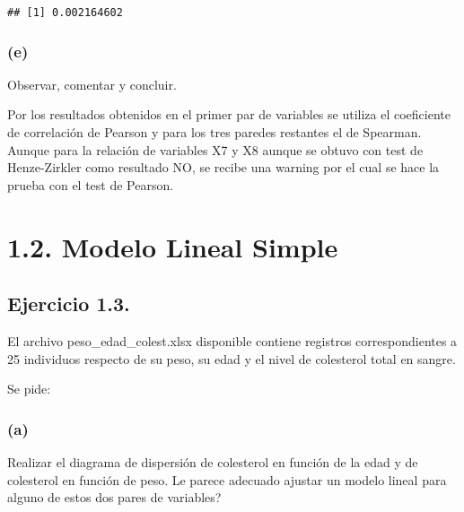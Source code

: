 \documentclass[
]{article}
\newenvironment{Shaded}{\begin{snugshade}}{\end{snugshade}}
\newcommand{\AttributeTok}[1]{\textcolor[rgb]{0.77,0.63,0.00}{#1}}
\newcommand{\FunctionTok}[1]{\textcolor[rgb]{0.00,0.00,0.00}{#1}}
\newcommand{\NormalTok}[1]{#1}
\newcommand{\SpecialCharTok}[1]{\textcolor[rgb]{0.00,0.00,0.00}{#1}}
\newcommand{\StringTok}[1]{\textcolor[rgb]{0.31,0.60,0.02}{#1}}
\begin{document}
\begin{Shaded}
\end{Shaded}

\begin{verbatim}
## [1] 0.002164602
\end{verbatim}

\hypertarget{e}{%
\subsubsection{(e)}\label{e}}

Observar, comentar y concluir.

Por los resultados obtenidos en el primer par de variables se utiliza el
coeficiente de correlación de Pearson y para los tres paredes restantes
el de Spearman. Aunque para la relación de variables X7 y X8 aunque se
obtuvo con test de Henze-Zirkler como resultado NO, se recibe una
warning por el cual se hace la prueba con el test de Pearson.

\hypertarget{modelo-lineal-simple}{%
\section{\texorpdfstring{{1.2. Modelo Lineal
Simple}}{1.2. Modelo Lineal Simple}}\label{modelo-lineal-simple}}

\hypertarget{ejercicio-1.3.}{%
\subsection{Ejercicio 1.3.}\label{ejercicio-1.3.}}

El archivo peso\_edad\_colest.xlsx disponible contiene registros
correspondientes a 25 individuos respecto de su peso, su edad y el nivel
de colesterol total en sangre.

Se pide:

\hypertarget{a-2}{%
\subsubsection{(a)}\label{a-2}}

Realizar el diagrama de dispersión de colesterol en función de la edad y
de colesterol en función de peso. Le parece adecuado ajustar un modelo
lineal para alguno de estos dos pares de variables?
\end{document}
